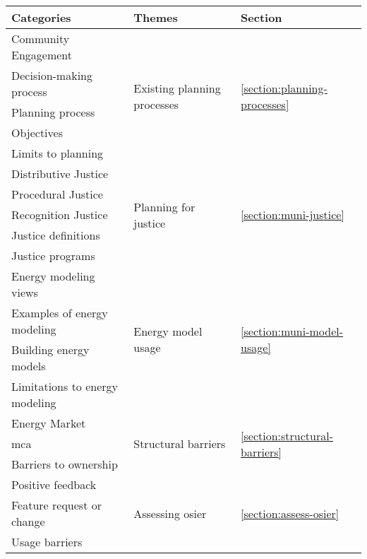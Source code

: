 \begin{tabular}{lll}
    \toprule
    Categories & Themes & Section \\
    \midrule
    Community Engagement&\multirow{5}{*}{Existing planning
    processes}&\multirow{5}{*}{\ref{section:planning-processes}}\\
    Decision-making process&&\\
    Planning process&&\\
    Objectives&&\\
    Limits to planning&&\\
    \midrule
    Distributive Justice&\multirow{5}{*}{Planning for
    justice}&\multirow{5}{*}{\ref{section:muni-justice}}\\
    Procedural Justice&&\\
    Recognition Justice&&\\
    Justice definitions&&\\
    Justice programs&&\\
    \midrule
    Energy modeling views&\multirow{4}{*}{Energy model
    usage}&\multirow{4}{*}{\ref{section:muni-model-usage}}\\
    Examples of energy modeling&&\\
    Building energy models&&\\
    Limitations to energy modeling&&\\
    \midrule
    Energy Market&\multirow{3}{*}{Structural
    barriers}&\multirow{3}{*}{\ref{section:structural-barriers}}\\
    \Acl{mca}&&\\
    Barriers to ownership&&\\
    \midrule
    Positive feedback&\multirow{3}{*}{Assessing
    \ac{osier}}&\multirow{3}{*}{\ref{section:assess-osier}}\\
    Feature request or change&&\\
    Usage barriers&&\\
    \bottomrule
\end{tabular}